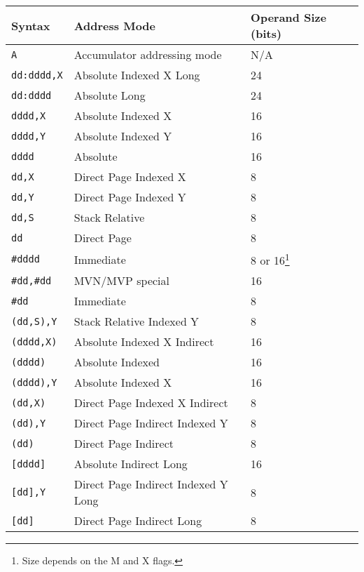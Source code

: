 \documentclass{report}
\begin{document}
    \begin{table}[!htb]
        \begin{center}
            \begin{tabular}{|l|l|l|} \hline
                Syntax & Address Mode & Operand Size (bits) \\ \hline\hline
                \verb+A+ & Accumulator addressing mode & N/A \\ \hline
                \verb+dd:dddd,X+ & Absolute Indexed X Long & 24 \\ \hline
                \verb+dd:dddd+ & Absolute Long & 24 \\ \hline
                \verb+dddd,X+ & Absolute Indexed X & 16 \\ \hline
                \verb+dddd,Y+ & Absolute Indexed Y & 16 \\ \hline
                \verb+dddd+ & Absolute & 16 \\ \hline
                \verb+dd,X+ & Direct Page Indexed X & 8 \\ \hline
                \verb+dd,Y+ & Direct Page Indexed Y & 8 \\ \hline
                \verb+dd,S+ & Stack Relative & 8 \\ \hline
                \verb+dd+ & Direct Page & 8 \\ \hline
                \verb+#dddd+ & Immediate & 8 or 16\footnote{Size depends on the M and X flags.} \\ \hline
                \verb+#dd,#dd+ & MVN/MVP special & 16 \\ \hline
                \verb+#dd+ & Immediate & 8 \\ \hline
                \verb+(dd,S),Y+ & Stack Relative Indexed Y & 8 \\ \hline
                \verb+(dddd,X)+ & Absolute Indexed X Indirect & 16 \\ \hline
                \verb+(dddd)+ & Absolute Indexed & 16 \\ \hline
                \verb+(dddd),Y+ & Absolute Indexed X & 16 \\ \hline
                \verb+(dd,X)+ & Direct Page Indexed X Indirect & 8 \\ \hline
                \verb+(dd),Y+ & Direct Page Indirect Indexed Y & 8 \\ \hline
                \verb+(dd)+ & Direct Page Indirect & 8 \\ \hline
                \verb+[dddd]+ & Absolute Indirect Long & 16 \\ \hline
                \verb+[dd],Y+ & Direct Page Indirect Indexed Y Long & 8 \\ \hline
                \verb+[dd]+ & Direct Page Indirect Long & 8 \\ \hline
            \end{tabular}
        \end{center}
    \end{table}
\end{document}
